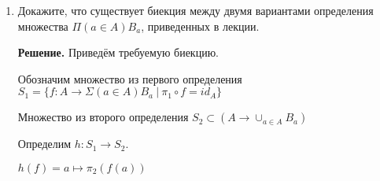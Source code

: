 \begin{enumerate}
\begin{enumerate}
\item Функция $plus : \mathbb{Q} \times \mathbb{Q} \to \mathbb{Q}$, возвращающая сумму двух чисел.
\begin{equation*}
	plus = ((p1, q1),  (p2, q2)) \mapsto (p1 * q2 + p2 * q1, q1 * q2)
\end{equation*}

Корректность: Функция сохраняет эквивалентность: если $(x_1,y_1) \sim (x_1',y_1')$ и $(x_2,y_2) \sim 
(x_2',y_2')$, то $plus([(x_1,y_1), (x_2, y_2)]_\sim) \sim plus([(x_1',y_1'), (x_2', y_2')]_\sim)$. 

Это свойство выполнено:

 $plus([(x_1,y_1), (x_2, y_2)]_\sim)     = (x_1 * y_2 + x_2 * y_1, y_1 * y_2)$,
 
 $plus([(x_1',y_1'), (x_2', y_2')]_\sim) = (x_1' * y_2' + x_2' * y_1', y_1' * y_2')$. 
 
 Заметим, что $(x_1 * y_2 + x_2 * y_1, y_1 * y_2) \sim (x_1' * y_2' + x_2' * y_1', y_1' * y_2') 
\Leftrightarrow (x_1 * y_2 + x_2 * y_1) * (y_1' * y_2') = (y_1 * y_2) * (x_1' * y_2' + x_2' * y_1') 
\Leftrightarrow x_1  y_2  y_1'  y_2' + x_2  y_1  y_1'  y_2' 
              = x_1'  y_2'  y_1  y_2 + x_2'  y_1'  y_1  y_2$
 
 Воспользуемся 
 $$(x_1,y_1) \sim (x_1',y_1') \Leftrightarrow x_1y_1' = x_1'y_1 = a$$
 $$(x_2,y_2) \sim (x_2',y_2') \Leftrightarrow x_2y_2' = x_2'y_2 = b$$
 
 Получим: 
 $$ y_2 y_2' \underline{y_1'x_1} +  y_1  y_1' \doubleunderline{x_2y_2'} 
 = \underline{x_1'y_1}  y_2' y_2 + \doubleunderline{x_2'y_2}  y_1'  y_1 \Leftrightarrow 
 a y_2 y_2' + b y_1  y_1' = a y_2' y_2 + b y_1'  y_1 $$
Последнее равенство очевидно, значит эквивалентность сохранена.

\end{enumerate}

\item Докажите, что существует биекция между двумя вариантами определения множества $\Pi (a \in A) B_a$, 
приведенных в лекции.

\textbf{Решение.} Приведём требуемую биекцию. 

Обозначим множество из первого определения $S_1 = \{f:A\rightarrow \Sigma(a\in A) B_a \ \big| \ \pi_1\circ f 
= id_A \}$

Множество из второго определения $S_2 \subset (A \rightarrow \cup_{a \in A} B_a)$

Определим $h:S_1 \rightarrow S_2$. 

$h(f) = a \mapsto \pi_2(f(a))$


\end{enumerate}
